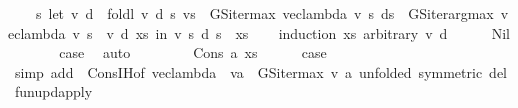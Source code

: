 \begin{isabellebody}
\ \ \ \ {\isacharparenleft}{\kern0pt}{\isasymlambda}s{\isacharprime}{\kern0pt}{\isachardot}{\kern0pt}\ let\ {\isacharparenleft}{\kern0pt}v{\isacharprime}{\kern0pt}{\isacharcomma}{\kern0pt}\ d{\isacharprime}{\kern0pt}{\isacharparenright}{\kern0pt}\ {\isacharequal}{\kern0pt}\ foldl\ {\isacharparenleft}{\kern0pt}{\isasymlambda}{\isacharparenleft}{\kern0pt}v{\isacharcomma}{\kern0pt}\ d{\isacharparenright}{\kern0pt}\ s{\isachardot}{\kern0pt}\ {\isacharparenleft}{\kern0pt}v{\isacharparenleft}{\kern0pt}s\ {\isacharcolon}{\kern0pt}{\isacharequal}{\kern0pt}\ GS{\isacharunderscore}{\kern0pt}iter{\isacharunderscore}{\kern0pt}max\ {\isacharparenleft}{\kern0pt}vec{\isacharunderscore}{\kern0pt}lambda\ v{\isacharparenright}{\kern0pt}\ s{\isacharparenright}{\kern0pt}{\isacharcomma}{\kern0pt}\ d{\isacharparenleft}{\kern0pt}s\ {\isacharcolon}{\kern0pt}{\isacharequal}{\kern0pt}\ GS{\isacharunderscore}{\kern0pt}iter{\isacharunderscore}{\kern0pt}arg{\isacharunderscore}{\kern0pt}max\ {\isacharparenleft}{\kern0pt}vec{\isacharunderscore}{\kern0pt}lambda\ v{\isacharparenright}{\kern0pt}\ s{\isacharparenright}{\kern0pt}{\isacharparenright}{\kern0pt}{\isacharparenright}{\kern0pt}\ {\isacharparenleft}{\kern0pt}{\isacharparenleft}{\kern0pt}{\isachardollar}{\kern0pt}{\isacharparenright}{\kern0pt}\ v{\isacharcomma}{\kern0pt}\ d{\isacharparenright}{\kern0pt}\ xs\ in\ {\isacharparenleft}{\kern0pt}v{\isacharprime}{\kern0pt}\ s{\isacharprime}{\kern0pt}{\isacharcomma}{\kern0pt}\ d{\isacharprime}{\kern0pt}\ s{\isacharprime}{\kern0pt}{\isacharparenright}{\kern0pt}{\isacharparenright}{\kern0pt}{\isachardoublequoteclose}\ \ xs\isanewline
\ \ \isamarkupfalse%
\ {\isacharparenleft}{\kern0pt}induction\ xs\ arbitrary{\isacharcolon}{\kern0pt}\ v\ d{\isacharparenright}{\kern0pt}\isanewline
\ \ \ \ \isamarkupfalse%
\ Nil\isanewline
\ \ \ \ \isamarkupfalse%
\ \isamarkupfalse%
\ {\isacharquery}{\kern0pt}case\ \isamarkupfalse%
\ auto\isanewline
\ \ \isamarkupfalse%
\isanewline
\ \ \ \ \isamarkupfalse%
\ {\isacharparenleft}{\kern0pt}Cons\ a\ xs{\isacharparenright}{\kern0pt}\isanewline
\ \ \ \ \isamarkupfalse%
\ {\isacharquery}{\kern0pt}case\isanewline
\ \ \ \ \ \ \isamarkupfalse%
\ {\isacharparenleft}{\kern0pt}simp\ add{\isacharcolon}{\kern0pt}\ {}\ Cons{\isachardot}{\kern0pt}IH{\isacharbrackleft}{\kern0pt}of\ {\isachardoublequoteopen}{\isacharparenleft}{\kern0pt}vec{\isacharunderscore}{\kern0pt}lambda\ {\isacharparenleft}{\kern0pt}{\isacharparenleft}{\kern0pt}{\isacharparenleft}{\kern0pt}{\isachardollar}{\kern0pt}{\isacharparenright}{\kern0pt}\ v{\isacharparenright}{\kern0pt}{\isacharparenleft}{\kern0pt}a\ {\isacharcolon}{\kern0pt}{\isacharequal}{\kern0pt}\ GS{\isacharunderscore}{\kern0pt}iter{\isacharunderscore}{\kern0pt}max\ v\ a{\isacharparenright}{\kern0pt}{\isacharparenright}{\kern0pt}{\isacharparenright}{\kern0pt}{\isachardoublequoteclose}{\isacharcomma}{\kern0pt}\ unfolded\ {}{\isacharbrackleft}{\kern0pt}symmetric{\isacharbrackright}{\kern0pt}{\isacharbrackright}{\kern0pt}\ del{\isacharcolon}{\kern0pt}\ fun{\isacharunderscore}{\kern0pt}upd{\isacharunderscore}{\kern0pt}apply{\isacharparenright}{\kern0pt}\isanewline

\end{isabellebody}

